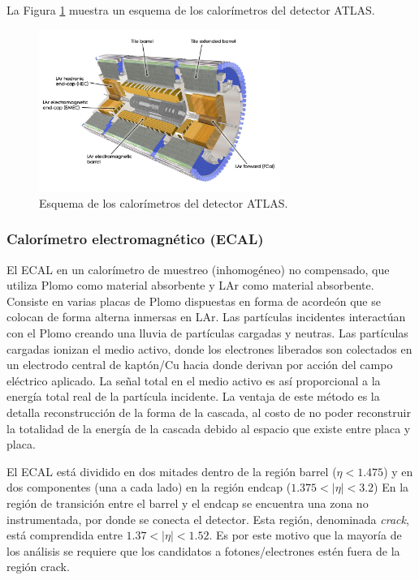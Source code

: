 La Figura \ref{calo_1} muestra un esquema de los calorímetros del detector ATLAS.

\begin{figure}
\centering
  \includegraphics[width=0.7\textwidth]{images/calo_1.jpg}
  \caption{Esquema de los calorímetros del detector ATLAS.}
  \label{calo_1}
\end{figure}

\subsubsection{Calorímetro electromagnético (ECAL)}

El ECAL en un calorímetro de muestreo (inhomogéneo) no compensado, que utiliza Plomo como material absorbente y LAr como material absorbente. Consiste en varias placas de Plomo dispuestas en forma de acordeón que se colocan de forma alterna inmersas en LAr. Las partículas incidentes interactúan con el Plomo creando una lluvia de partículas cargadas y neutras. Las partículas cargadas ionizan el medio activo, donde los electrones liberados son colectados en un electrodo central de kaptón/Cu hacia donde derivan por acción del campo eléctrico aplicado. La señal total en el medio activo es así proporcional a la energía total real de la partícula incidente. La ventaja de este método es la detalla reconstrucción de la forma de la cascada, al costo de no poder reconstruir la totalidad de la energía de la cascada debido al espacio que existe entre placa y placa.


El ECAL está dividido en dos mitades dentro de la
región barrel ($\eta < 1.475$) y en dos componentes (una a cada
lado) en la región endcap ($1.375 < |\eta| < 3.2$) En la región de transición entre el barrel y el endcap se encuentra una zona no instrumentada, por donde se conecta el detector. Esta región, denominada \textit{crack}, está comprendida entre $1.37 < |\eta| < 1.52$. Es por este motivo que la mayoría de los análisis se requiere que los candidatos a fotones/electrones estén fuera de la región crack.

